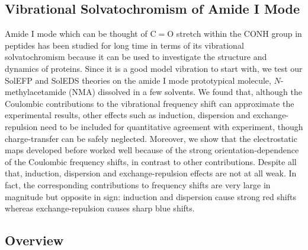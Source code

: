 \documentclass[b5paper,oneside,fleqn,11pt]{book}
\begin{document}
\begin{refsection}
%


\printbibliography[heading=subbibintoc,title={References}]
\end{refsection}


\begin{refsection}
\chapter{Vibrational Solvatochromism of Amide I Mode\label{c:nma-amide-I}}

Amide I mode which can be thought of C$=$O stretch within
the CONH group in peptides has been studied for long time
in terms of its vibrational solvatochromism because it can
be used to investigate the structure and dynamics of proteins. 
Since it is a good model vibration to start with,
we test our SolEFP and SolEDS theories on the amide I mode
prototypical molecule, $N$-methylacetamide (NMA) dissolved
in a few solvents. We found that, although the Coulombic
contributions to the vibrational frequency shift can approximate
the experimental results, other effects such as induction,
dispersion and exchange\hyp{}repulsion need to be included
for quantitative agreement with experiment, though charge\hyp{}transfer
can be safely neglected. Moreover, we show that the electrostatic
maps developed before worked well because of the strong
orientation\hyp{}dependence of the Coulombic frequency shifts,
in contrast to other contributions. Despite all that, induction,
dispersion and exchange\hyp{}repulsion effects are not at all
weak. In fact, the corresponding contributions to frequency shifts
are very large in magnitude but opposite in sign: induction
and dispersion cause strong red shifts whereas exchange\hyp{}repulsion
causes sharp blue shifts.

\section{Overview}


\end{refsection}
\end{document}
